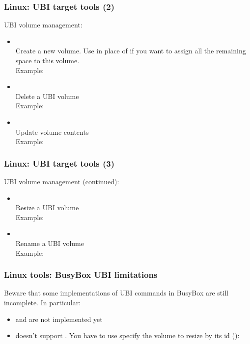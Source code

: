 \begin{frame}
  \frametitle{Linux: UBI target tools (2)}
  UBI volume management:
    \begin{itemize}
    \item {\small {}}\\
	Create a new volume. Use  in place of 
	if you want to assign all the remaining space to this volume.\\
        Example: 
    \item {\small {}}\\
	Delete a UBI volume\\
        Example: 
    \item {\small {}}\\
	Update volume contents\\
        Example: 
    \end{itemize}
\end{frame}

\begin{frame}
  \frametitle{Linux: UBI target tools (3)}
  UBI volume management (continued):
    \begin{itemize}
    \item {\small {}}\\
	Resize a UBI volume\\
        Example: 
    \item {\small {}}\\
	Rename a UBI volume\\
        Example: 
    \end{itemize}
\end{frame}

\begin{frame}
  \frametitle{Linux tools: BusyBox UBI limitations}
  Beware that some implementations of UBI commands in BusyBox are still
  incomplete. In particular:
  \begin{itemize}
    \item {} and  are not implemented yet
    \item {} doesn't support . You have
      to use specify the volume to resize by its id ():\\
    \end{itemize}
\end{frame}

